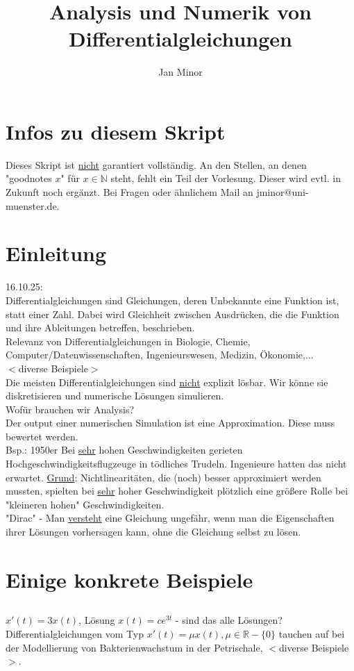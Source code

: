 \documentclass[12pt,a4paper]{article}
\author{Jan Minor}
\title{Analysis und Numerik von Differentialgleichungen}
\begin{document}
\setcounter{section}{-1}
\section{Infos zu diesem Skript}
Dieses Skript ist \underline{nicht} garantiert vollständig. An den Stellen, an denen "goodnotes $x$" für $x \in \mathbb{N}$ steht, fehlt ein Teil der Vorlesung. Dieser wird evtl. in Zukunft noch ergänzt. Bei Fragen oder ähnlichem Mail an jminor@uni-muenster.de.
\newpage
\section{Einleitung}
16.10.25: \\
Differentialgleichungen sind Gleichungen, deren Unbekannte eine Funktion ist, statt einer Zahl. Dabei wird Gleichheit zwischen Ausdrücken, die die Funktion und ihre Ableitungen betreffen, beschrieben. \\
Relevanz von Differentialgleichungen in Biologie, Chemie, Computer/Datenwissenschaften, Ingenieurswesen, Medizin, Ökonomie,... \\
$<$diverse Beispiele$>$ \\
Die meisten Differentialgleichungen sind \underline{nicht} explizit lösbar. Wir könne sie diskretisieren und numerische Lösungen simulieren. \\
Wofür brauchen wir Analysis? \\
Der output einer numerischen Simulation ist eine Approximation. Diese muss bewertet werden. \\
Bsp.: 1950er Bei \underline{sehr} hohen Geschwindigkeiten gerieten Hochgeschwindigkeitsflugzeuge in tödliches Trudeln. Ingenieure hatten das nicht erwartet. \underline{Grund}: Nichtlinearitäten, die (noch) besser approximiert werden mussten, spielten bei \underline{sehr} hoher Geschwindigkeit plötzlich eine größere Rolle bei "kleineren hohen" Geschwindigkeiten. \\
"Dirac" - Man \underline{versteht} eine Gleichung ungefähr, wenn man die Eigenschaften ihrer Lösungen vorhersagen kann, ohne die Gleichung selbst zu lösen. \\
\section{Einige konkrete Beispiele}
\subsection{}
$x'(t) = 3x(t)$, Lösung $x(t) = ce^{3t}$ - sind das alle Lösungen? \\
Differentialgleichungen vom Typ $x'(t)=\mu x(t), \mu \in \mathbb{R}-\{0\}$ tauchen auf bei der Modellierung von Bakterienwachstum in der Petrischale, $<$diverse Beispiele$>$.
\end{document}
